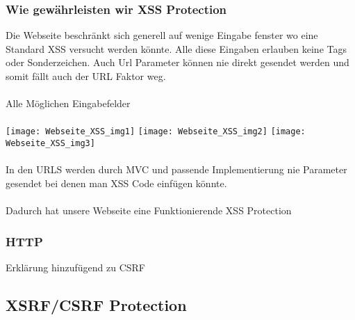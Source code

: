 {\subsubsection{Wie gewährleisten wir XSS Protection}
\label{sec:xss_prot}
Die Webseite beschränkt sich generell auf wenige Eingabe fenster wo eine Standard XSS versucht werden könnte. Alle diese Eingaben erlauben keine Tags oder Sonderzeichen. Auch Url Parameter können nie direkt gesendet werden und somit fällt auch der URL Faktor weg.
\\ \\
Alle Möglichen Eingabefelder
\\ \\
\texttt{[image: Webseite\_XSS\_img1]}
\texttt{[image: Webseite\_XSS\_img2]}
\texttt{[image: Webseite\_XSS\_img3]}
\\ \\
In den URLS werden durch MVC und passende Implementierung nie Parameter gesendet bei denen man XSS Code einfügen könnte.\\ \\
Dadurch hat unsere Webseite eine Funktionierende XSS Protection
\subsubsection{HTTP}
Erklärung hinzufügend zu CSRF
\subsection{XSRF/CSRF Protection}
\label{sec:csrf}
}
